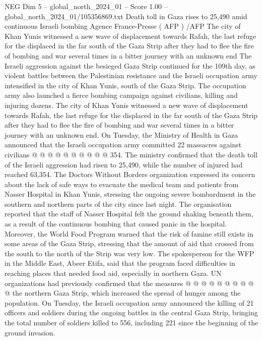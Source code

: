 \begin{textsample}{NEG Dim 5 – global\_north\_2024\_01 – Score 1.00 – global\_north\_2024\_01/105356869.txt}  \label{ex:f5_neg_349}
Death toll in Gaza rises to 25,490 amid continuous Israeli bombing Agence France-Presse ( AFP ) /AFP The city of Khan Yunis witnessed a new wave of displacement towards Rafah, the last refuge for the displaced in the far south of the Gaza Strip after they had to flee the fire of bombing and war several times in a bitter journey with an unknown end The Israeli aggression against the besieged Gaza Strip continued for the 109th day, as violent battles between the Palestinian resistance and the Israeli occupation army intensified in the city of Khan Yunis, south of the Gaza Strip.
The occupation army also launched a fierce bombing campaign against civilians, killing and injuring dozens.
The city of Khan Yunis witnessed a new wave of displacement towards Rafah, the last refuge for the displaced in the far south of the Gaza Strip after they had to flee the fire of bombing and war several times in a bitter journey with an unknown end.
On Tuesday, the Ministry of Health in Gaza announced that the Israeli occupation army committed 22 massacres against civilians @ @ @ @ @ @ @ @ @ @ 354.
The ministry confirmed that the death toll of the Israeli aggression had risen to 25,490, while the number of injured had reached 63,354.
The Doctors Without Borders organization expressed its concern about the lack of safe ways to evacuate the medical team and patients from Nasser Hospital in Khan Yunis, stressing the ongoing severe bombardment in the southern and northern parts of the city since last night.
The organisation reported that the staff of Nasser Hospital felt the ground shaking beneath them, as a result of the continuous bombing that caused panic in the hospital.
Moreover, the World Food Program warned that the risk of famine still exists in some areas of the Gaza Strip, stressing that the amount of aid that crossed from the south to the north of the Strip was very low.
The spokesperson for the WFP in the Middle East, Abeer Etifa, said that the program faced difficulties in reaching places that needed food aid, especially in northern Gaza.
UN organizations had previously confirmed that the measures @ @ @ @ @ @ @ @ @ @ the northern Gaza Strip, which increased the spread of hunger among the population.
On Tuesday, the Israeli occupation army announced the killing of 21 officers and soldiers during the ongoing battles in the central Gaza Strip, bringing the total number of soldiers killed to 556, including 221 since the beginning of the ground invasion.

\end{textsample}

